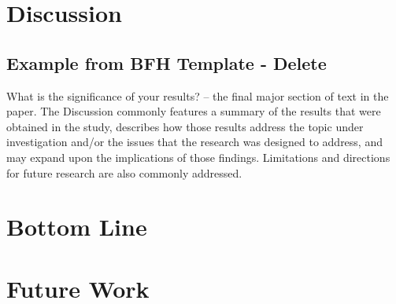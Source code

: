 \section{Discussion}
\subsection{Example from BFH Template - Delete}
What is the significance of your results? – the final major section of text in the paper.  The Discussion commonly features a summary of the results that were obtained in the study, describes how those results address the topic under investigation and/or the issues that the research was designed to address, and may expand upon the implications of those findings.  Limitations and directions for future research are also commonly addressed.

\section{Bottom Line}

\section{Future Work}
